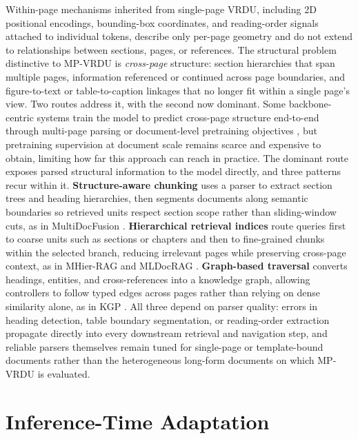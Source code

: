 \documentclass[11pt]{article}
\begin{document}
Within-page mechanisms inherited from single-page VRDU, including 2D positional encodings, bounding-box coordinates, and reading-order signals attached to individual tokens, describe only per-page geometry and do not extend to relationships between sections, pages, or references. The structural problem distinctive to MP-VRDU is \textit{cross-page} structure: section hierarchies that span multiple pages, information referenced or continued across page boundaries, and figure-to-text or table-to-caption linkages that no longer fit within a single page's view. Two routes address it, with the second now dominant. Some backbone-centric systems train the model to predict cross-page structure end-to-end through multi-page parsing or document-level pretraining objectives \cite{hu2025mplugdocowl2,duan2025docopilot}, but pretraining supervision at document scale remains scarce and expensive to obtain, limiting how far this approach can reach in practice. The dominant route exposes parsed structural information to the model directly, and three patterns recur within it. \textbf{Structure-aware chunking} uses a parser to extract section trees and heading hierarchies, then segments documents along semantic boundaries so retrieved units respect section scope rather than sliding-window cuts, as in MultiDocFusion \cite{shin2025multidocfusion}. \textbf{Hierarchical retrieval indices} route queries first to coarse units such as sections or chapters and then to fine-grained chunks within the selected branch, reducing irrelevant pages while preserving cross-page context, as in MHier-RAG \cite{gong2025mhierrag} and MLDocRAG \cite{zhang2026mldocrag}. \textbf{Graph-based traversal} converts headings, entities, and cross-references into a knowledge graph, allowing controllers to follow typed edges across pages rather than relying on dense similarity alone, as in KGP \cite{wang2024knowledge}. All three depend on parser quality: errors in heading detection, table boundary segmentation, or reading-order extraction propagate directly into every downstream retrieval and navigation step, and reliable parsers themselves remain tuned for single-page or template-bound documents rather than the heterogeneous long-form documents on which MP-VRDU is evaluated.

\section{Inference-Time Adaptation}
\label{sec:inference-time}
\end{document}
